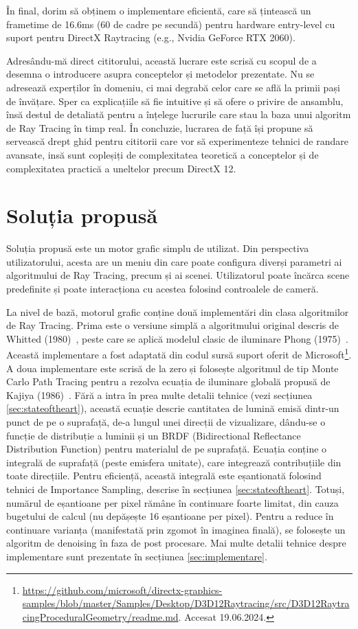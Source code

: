 \documentclass[12pt,a4paper]{report}
\numberwithin{equation}{section} %
\begin{document}
În final, dorim să obținem o implementare eficientă, care să țintească un frametime de 16.6ms
(60 de cadre pe secundă) pentru hardware entry-level cu suport pentru
DirectX Raytracing (e.g., Nvidia GeForce RTX 2060).

Adresându-mă direct cititorului, această lucrare este scrisă cu scopul de a desemna
o introducere asupra conceptelor și metodelor prezentate. Nu se adresează experților
în domeniu, ci mai degrabă celor care se află la primii pași de învățare. Sper
ca explicațiile să fie intuitive și să ofere o privire de ansamblu, însă destul de
detaliată pentru a înțelege lucrurile care stau la baza unui algoritm de Ray Tracing
în timp real. În concluzie, lucrarea de față își propune să servească drept ghid
pentru cititorii care vor să experimenteze tehnici de randare avansate, insă
sunt copleșiți de complexitatea teoretică a conceptelor și de complexitatea practică
a uneltelor precum DirectX 12.

\section{Soluția propusă}
Soluția propusă este un motor grafic simplu de utilizat. Din perspectiva utilizatorului,
acesta are un meniu din care poate configura diverși parametri ai algoritmului
de Ray Tracing, precum și ai scenei. Utilizatorul poate încărca scene predefinite
și poate interacționa cu acestea folosind controalele de cameră.

La nivel de bază, motorul grafic conține două implementări din clasa algoritmilor
de Ray Tracing. Prima este o versiune simplă a algoritmului original descris de
Whitted (1980)~\cite{Whitted}, peste care se aplică modelul clasic de iluminare
Phong (1975)~\cite{Phong}. Această implementare a fost adaptată din codul sursă
suport oferit de Microsoft\footnote{\url{https://github.com/microsoft/directx-graphics-samples/blob/master/Samples/Desktop/D3D12Raytracing/src/D3D12RaytracingProceduralGeometry/readme.md}. Accesat 19.06.2024.}.
A doua implementare este scrisă de la zero și folosește algoritmul de tip Monte Carlo
Path Tracing pentru a rezolva ecuația de iluminare globală propusă de Kajiya (1986)~\cite{Kajiya}.
Fără a intra în prea multe detalii tehnice (vezi secțiunea \ref{sec:stateoftheart}),
această ecuație descrie cantitatea de lumină emisă dintr-un punct de pe o suprafață,
de-a lungul unei direcții de vizualizare, dându-se o funcție de distribuție a luminii
și un BRDF (Bidirectional Reflectance Distribution Function) pentru materialul de pe
suprafață. Ecuația conține o integrală de suprafață (peste emisfera unitate), care
integrează contribuțiile din toate direcțiile. Pentru eficiență, această integrală
este eșantionată folosind tehnici de Importance Sampling, descrise în secțiunea \ref{sec:stateoftheart}.
Totuși, numărul de eșantioane per pixel rămâne în continuare foarte limitat, din
cauza bugetului de calcul (nu depășește 16 eșantioane per pixel). Pentru a reduce
în continuare varianța (manifestată prin zgomot în imaginea finală), se folosește
un algoritm de denoising în faza de post procesare. Mai multe detalii tehnice
despre implementare sunt prezentate în secțiunea \ref{sec:implementare}.
\end{document}
